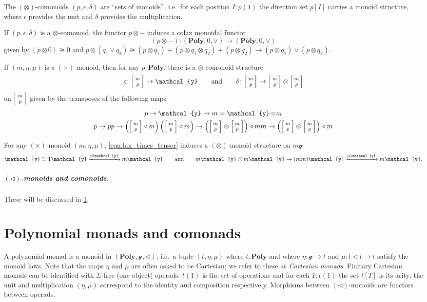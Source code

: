 \documentclass[11pt, one side, article]{memoir}
\makeatletter
\theoremstyle{definition}
\theoremstyle{plain}
\newcommand{\Cat}[1]{\mathbf{#1}}%
\newcommand{\To}[2][]{\xrightarrow[#1]{\tn{$#2$}}}
\newcommand{\tn}[1]{\textnormal{#1}}
\newcommand{\yon}{{\mathcal{y}}}
\newcommand{\poly}{\Cat{Poly}}
\newcommand{\0}{\textsf{0}}
\newcommand{\1}{\tn{\textsf{1}}}
\newcommand{\tri}{\mathbin{\triangleleft}}
\newcommand{\biglens}[2]{
     \begin{bmatrix}{\vphantom{f_f^f}#2} \\ {\vphantom{f_f^f}#1} \end{bmatrix}
}
\newcommand{\littlelens}[2]{
     \begin{bsmallmatrix}{\vphantom{f}#2} \\ {\vphantom{f}#1} \end{bsmallmatrix}
}
\newcommand{\lens}[2]{
  \relax\if@display
     \biglens{#1}{#2}
  \else
     \littlelens{#1}{#2}
  \fi
}
\newcommand{\hh}[2][]{#1 \tn{#2} #1}
\newcommand{\qqand}{\hh[\qquad]{and}}
\makeatother
\begin{document}
The $(\otimes)$-comonoids $(p,\epsilon,\delta)$ are ``sets of monoids'', i.e.\ for each position $I:p(1)$ the direction set $p[I]$ carries a monoid structure, where $\epsilon$ provides the unit and $\delta$ provides the multiplication.

If $(p,\epsilon,\delta)$ is a $\otimes$-comonoid, the functor $p\otimes-$ induces a colax monoidal functor
\begin{equation}
	(p\otimes -)\colon(\poly,0,\vee)\to(\poly,0,\vee)
\end{equation}
given by $(p\otimes 0)\cong0$ and $p\otimes (q_1\vee q_2)\cong(p\otimes q_1)+(p\otimes q_1\otimes q_2)+(p\otimes q_2)\to(p\otimes q_1)\vee(p\otimes q_2)$.

If $(m,\eta,\mu)$ is a $(\times)$-monoid, then for any $p:\poly$, there is a $\otimes$-comonoid structure
\begin{equation}
	\epsilon\colon\lens{p}{m}\to\yon
	\qqand
	\delta\colon\lens{p}{m}\to\lens{p}{m}\otimes\lens{p}{m}
\end{equation}
on $\lens{p}{m}$ given by the transposes of the following maps
\begin{gather}
	p\to \yon\to m=\yon\tri m\\
	p\to pp\to\left(\lens{p}{m}\tri m\right)\left(\lens{p}{m}\tri m\right)\to\left(\lens{p}{m}\otimes\lens{p}{m}\right)\tri mm\to\left(\lens{p}{m}\otimes\lens{p}{m}\right)\tri m
\end{gather}

For any $(\times)$-monoid $(m,\eta,\mu)$, \eqref{eqn.lax_times_tensor} induces a $(\otimes)$-monoid structure on $m\yon$
\begin{equation}
	\yon\cong1\yon\To{\eta\yon} m\yon
	\qqand
	m\yon\otimes m\yon\to (mm)\yon\To{\mu\yon} m\yon.
\end{equation}



\paragraph{$(\tri)$-monoids and comonoids.} These will be discussed in \cref{chap.monad_comonad}.


\chapter{Polynomial monads and comonads}\label{chap.monad_comonad}

A polynomial monad is a monoid in $(\poly,\yon,\tri)$, i.e.\ a tuple $(t,\eta,\mu)$ where $t:\poly$ and where $\eta\colon\yon\to t$ and $\mu\colon t\tri t\to t$ satisfy the monoid laws. Note that the maps $\eta$ and $\mu$ are often asked to be Cartesian; we refer to these as \emph{Cartesian monads}. Finitary Cartesian monads can be identified with $\Sigma$-free (one-object) operads: $t(1)$ is the set of operations and for each $T:t(1)$ the set $t[T]$ is its arity; the unit and multiplication $(\eta,\mu)$ correspond to the identity and composition respectively. Morphisms between $(\tri)$-monoids are functors between operads.
\end{document}
